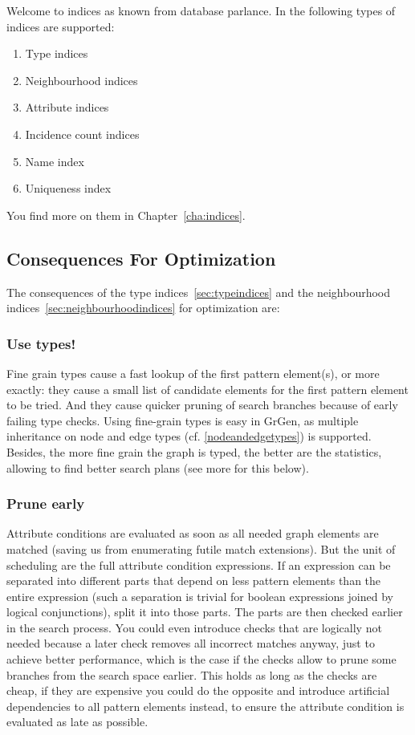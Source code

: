 Welcome to indices as known from database parlance.
In \GrG{} the following types of indices are supported:
\begin{enumerate}
	\item Type indices
	\item Neighbourhood indices
	\item Attribute indices
	\item Incidence count indices
	\item Name index
	\item Uniqueness index
\end{enumerate}

You find more on them in Chapter~\ref{cha:indices}.

\subsection{Consequences For Optimization}

The consequences of the type indices~\ref{sec:typeindices} and the neighbourhood indices~\ref{sec:neighbourhoodindices} for optimization are:

\subsubsection*{Use types!}
Fine grain types cause a fast lookup of the first pattern element(s), or more exactly: they cause a small list of candidate elements for the first pattern element to be tried.
And they cause quicker pruning of search branches because of early failing type checks.
Using fine-grain types is easy in GrGen, as multiple inheritance on node and edge types (cf. \ref{nodeandedgetypes}) is supported.
Besides, the more fine grain the graph is typed, the better are the statistics, allowing \GrG{ } to find better search plans (see more for this below).

\subsubsection*{Prune early}
Attribute conditions are evaluated as soon as all needed graph elements are matched (saving us from enumerating futile match extensions).
But the unit of scheduling are the full attribute condition expressions. 
If an expression can be separated into different parts that depend on less pattern elements than the entire expression (such a separation is trivial for boolean expressions joined by logical conjunctions), split it into those parts.
The parts are then checked earlier in the search process.
You could even introduce checks that are logically not needed because a later check removes all incorrect matches anyway, just to achieve better performance, which is the case if the checks allow to prune some branches from the search space earlier.
This holds as long as the checks are cheap, if they are expensive you could do the opposite and introduce artificial dependencies to all pattern elements instead, to ensure the attribute condition is evaluated as late as possible.

